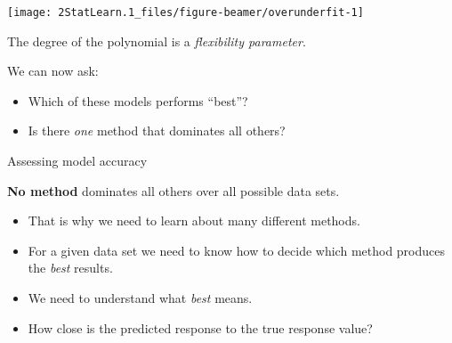 \documentclass[ignorenonframetext,]{beamer}
\providecommand{\tightlist}{%
  \setlength{\itemsep}{0pt}\setlength{\parskip}{0pt}}
\begin{document}
\begin{frame}

\begin{center}\texttt{[image: 2StatLearn.1\_files/figure-beamer/overunderfit-1]} \end{center}

The degree of the polynomial is a \emph{flexibility parameter}.

\end{frame}

\begin{frame}

We can now ask:

\begin{itemize}
\item
  Which of these models performs ``best''?
\item
  Is there \emph{one} method that dominates all others?
\end{itemize}

\end{frame}

\begin{frame}{Assessing model accuracy}

\textbf{No method} dominates all others over all possible data sets.

\begin{itemize}
\tightlist
\item
  That is why we need to learn about many different methods.
\item
  For a given data set we need to know how to decide which method
  produces the \emph{best} results.
\item
  We need to understand what \emph{best} means.
\item
  How close is the predicted response to the true response value?
\end{itemize}

\end{frame}
\end{document}

